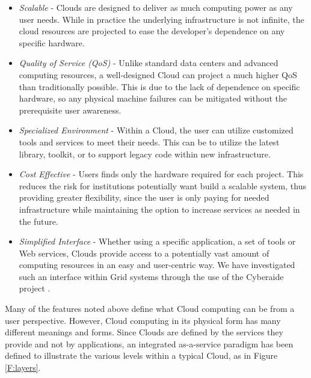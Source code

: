 \begin{itemize}

\item{\em Scalable} - Clouds are designed to deliver as much computing power as any user needs.  While in practice the underlying infrastructure is not infinite, the cloud resources are projected to ease the developer's dependence on any specific hardware.

\item{\em Quality of Service (QoS)} - Unlike standard data centers and advanced computing resources, a well-designed Cloud can project a much higher QoS than traditionally possible.  This is due to the lack of dependence on specific hardware, so any physical machine failures can be mitigated without the prerequisite user awareness.

\item{\em Specialized Environment} - Within a Cloud, the user can utilize customized tools and services to meet their needs. This can be to utilize the latest library, toolkit, or to support legacy code within new infrastructure.  

\item{\em Cost Effective} - Users finds only the hardware required for each project.  This reduces the risk for institutions potentially want build a scalable system, thus providing greater flexibility, since the user is only paying for needed infrastructure while maintaining the option to increase services as needed in the future.

\item{\em Simplified Interface} - Whether using a specific application, a set of tools or Web services, Clouds provide access to a potentially vast amount of computing resources in an easy and user-centric way. We have investigated such an interface within Grid systems through the use of the Cyberaide project \cite{las09ccgrid, las08-javascript}.

\end{itemize}




Many of the features noted above define what Cloud computing can be from a user perspective.  However, Cloud computing in its physical form has many different meanings and forms.  Since Clouds are defined by the services they provide and not by applications, an integrated as-a-service paradigm has been defined to illustrate the various levels within a typical Cloud, as in Figure \ref{F:layers}.


